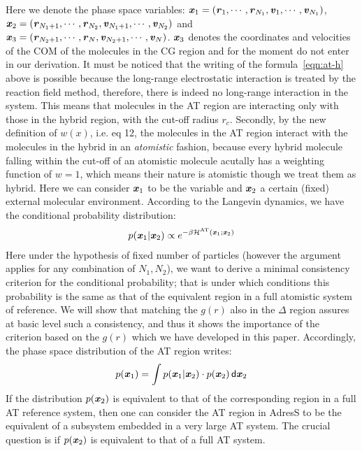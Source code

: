 \documentclass[aps,pre,preprint]{revtex4}
\newcommand{\redc}[1]{{\color{red} #1}}
\renewcommand{\v}[1]{\textbf{\textit{#1}}}
\renewcommand{\d}[1]{\textsf{#1}}
\begin{document}
Here we denote the phase space variables: $\v x_1 = (\v r_1, \cdots, \v
r_{N_1}, \v v_1, \cdots, \v v_{N_1})$,  $\v x_2 = (\v r_{N_1+1},
\cdots, \v r_{N_2}, \v v_{N_1+1}, \cdots, \v v_{N_2})$ and
$\v x_3 = (\v r_{N_2+1},
\cdots, \v r_{N}, \v v_{N_2+1}, \cdots, \v v_{N})$. $\v x_{3}$ denotes the coordinates and velocities of the COM of the molecules in the CG region and for the moment do not enter in our derivation.
\redc{It must be noticed that the writing of the formula~\eqref{eqn:at-h} above is possible because the long-range electrostatic interaction is treated by the reaction
field method, therefore, there is indeed no long-range interaction in
the system. This means that molecules in the AT region are interacting only with those in the hybrid
region, with the cut-off radius $r_c$. Secondly, by the new
definition of $w(x)$, i.e. eq 12, the molecules in the AT
region interact with the molecules in the hybrid in an 
\emph{atomistic} fashion, because every hybrid molecule falling within the cut-off of
an atomistic molecule acutally has a weighting function of $w=1$,
which means their nature is atomistic though we treat them as hybrid.}
Here we can consider $\v x_1$ to be the variable and $\v x_2$ a certain (fixed) external molecular environment. 
According to the Langevin dynamics, we have the conditional probability distribution:
\begin{align}
  p (\v x_1 \vert \v x_2)  \propto
  e^{-\beta \mathcal H^{\textrm{AT}}(\v x_1; \v x_2)}
\end{align}
\redc{Here under the hypothesis of fixed number of particles (however the argument applies for any combination of $N_{1},N_{2}$), we want to derive a minimal consistency criterion for the conditional probability; that is under which conditions this probability is the same as that of the equivalent region in a full atomistic system of reference. We will show that matching the $g(r)$ also in the $\Delta$ region assures at basic level such a consistency, and thus it shows the importance of the criterion based on the $g(r)$ which we have developed in this paper.}
Accordingly, the phase space distribution of the AT region writes:
\begin{align}
  p(\v x_1) = \int p(\v x_1\vert\v x_2)\cdot p (\v x_2) \,\d d\v x_2
\end{align}
If the distribution $p(\v x_2)$ is equivalent to that of the corresponding region in a full AT reference system, then one can consider the AT region in AdresS to be the equivalent of a subsystem embedded in  a very large AT
system.
The crucial question is if $p(\v x_2)$ is equivalent to that of a full AT system. 
\end{document}
